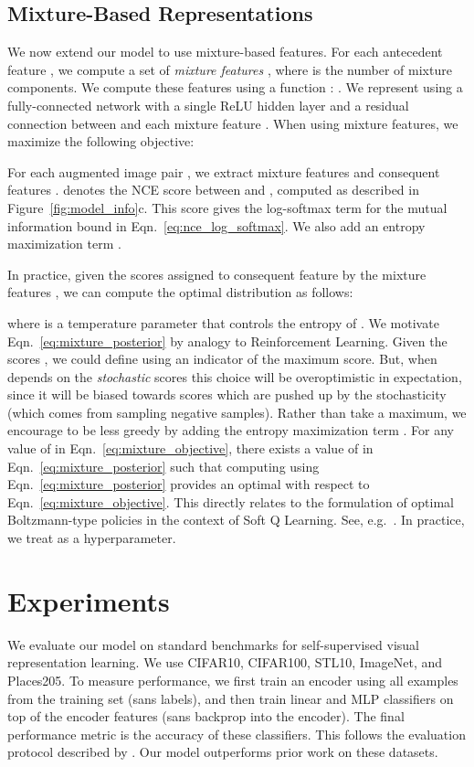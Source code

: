 \documentclass{article}
\begin{document}
\subsection{Mixture-Based Representations}
\label{sec:mixtures}
We now extend our model to use mixture-based features.
For each antecedent feature , we compute a set of \emph{mixture features} , where  is the number of mixture components. We compute these features using a function : .
We represent  using a fully-connected network with a single ReLU hidden layer and a residual connection between  and each mixture feature .
When using mixture features, we maximize the following objective:

For each augmented image pair , we extract  mixture features  and  consequent features .  denotes the NCE score between  and , computed as described in Figure~\ref{fig:model_info}c. This score gives the log-softmax term for the mutual information bound in Eqn.~\ref{eq:nce_log_softmax}. We also add an entropy maximization term .

In practice, given the  scores  assigned to consequent feature  by the  mixture features , we can compute the optimal distribution  as follows:

where  is a temperature parameter that controls the entropy of . We motivate Eqn.~\ref{eq:mixture_posterior} by analogy to Reinforcement Learning. Given the scores , we could define  using an indicator of the maximum score. But, when  depends on the \emph{stochastic} scores this choice will be overoptimistic in expectation, since it will be biased towards scores which are pushed up by the stochasticity (which comes from sampling negative samples).
Rather than take a maximum, we encourage  to be less greedy by adding the entropy maximization term . For any value of  in Eqn.~\ref{eq:mixture_objective}, there exists a value of  in Eqn.~\ref{eq:mixture_posterior} such that computing  using Eqn.~\ref{eq:mixture_posterior} provides an optimal  with respect to Eqn.~\ref{eq:mixture_objective}. This directly relates to the formulation of optimal Boltzmann-type policies in the context of Soft Q Learning. See, e.g.~\cite{Haarnoja2017}. In practice, we treat  as a hyperparameter. 
\section{Experiments}
\label{sec:experiments}




We evaluate our model on standard benchmarks for self-supervised visual representation learning.
We use CIFAR10, CIFAR100, STL10, ImageNet, and Places205.
To measure performance, we first train an encoder using all examples from the training set (sans labels), and then train linear and MLP classifiers on top of the encoder features  (sans backprop into the encoder).
The final performance metric is the accuracy of these classifiers.
This follows the evaluation protocol described by \citet{Kolesnikov2019}.
Our model outperforms prior work on these datasets.
\end{document}
